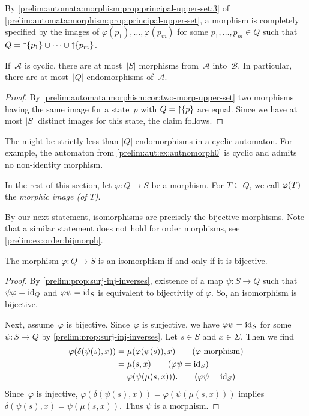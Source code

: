 By \cref{prelim:automata:morphism:prop:principal-upper-set:3} of \cref{prelim:automata:morphism:prop:principal-upper-set}, a morphism
is completely specified by the images of $\varphi(p_1), \ldots, \varphi(p_m)$
for some $p_1, \ldots, p_m \in Q$ such that 
$Q = \mbox{\ensuremath{\displaystyle \uparrow \!\!\{p_1\}}} \cup \cdots \cup \mbox{\ensuremath{\displaystyle \uparrow \!\!\{p_m\}}}$.

\begin{corollary}
	If~$\mathcal A$ is cyclic, there are at most~$|S|$ morphisms
	from~$\mathcal A$ into~$\mathcal B$.
	In particular, there are at most~$|Q|$ endomorphisms of~$\mathcal A$.
\end{corollary}
\begin{proof}
	By \cref{prelim:automata:morphism:cor:two-morp-upper-set} 
	two morphisms having the same image for a state~$p$ with $Q = \mbox{\ensuremath{\displaystyle \uparrow \!\!\{p\}}}$
	are equal. Since we have at most $|S|$ distinct images for this state,
	the claim follows.
\end{proof}

\begin{example}
	The might be strictly less than $|Q|$ endomorphisms in a cyclic automaton.
	For example, the automaton from \cref{prelim:aut:ex:autnomorph0}
	is cyclic and admits no non-identity morphism.
\end{example}

In the rest of this section, let  $\varphi \colon Q \to S$ 
be a morphism. For $T \subseteq Q$, we call $\varphi(T)$ the \emph{morphic image (of $T$)}.

By our next statement, isomorphisms are precisely the bijective morphisms. 
Note that a similar statement does not hold for order morphisms, see \cref{prelim:ex:order:bijmorph}.

\begin{proposition}\label{prelim:prop:iso-bijmorph}
	The morphism $\varphi \colon Q \to S$ is an isomorphism if and only if it is bijective.
\end{proposition}
\begin{proof}
	By \cref{prelim:prop:surj-inj-inverses}, existence of a map $\psi \colon S \to Q$ 
	such that $\psi \varphi = \operatorname{id}_Q$
	and $\varphi \psi = \operatorname{id}_S$
	is equivalent to bijectivity of $\varphi$. So, an isomorphism is bijective.
	
	Next, assume~$\varphi$ is bijective. 
	Since~$\varphi$ is surjective,
	we have $\varphi \psi = \operatorname{id}_S$
	for some $\psi \colon S \to Q$ 
	by \cref{prelim:prop:surj-inj-inverses}.
	Let $s \in S$ and $x \in \Sigma$.
	Then we find
	\begin{align*}
		\varphi(\delta(\psi(s), x))
		& = \mu(\varphi(\psi(s)), x) \tag{$\varphi$ morphism} \\
		& = \mu(s, x) \tag{$\concat{\psi}{\varphi} = \operatorname{id}_S$} \\
		& = \varphi(\psi(\mu(s, x))). \tag{$\concat{\psi}{\varphi} = \operatorname{id}_S$}
	\end{align*}
	Since~$\varphi$ is injective, $\varphi(\delta(\psi(s), x)) = 
	\varphi(\psi(\mu(s, x)))$
	implies $\delta(\psi(s), x) = \psi(\mu(s, x))$.
	Thus $\psi$ is a morphism.
\end{proof}


